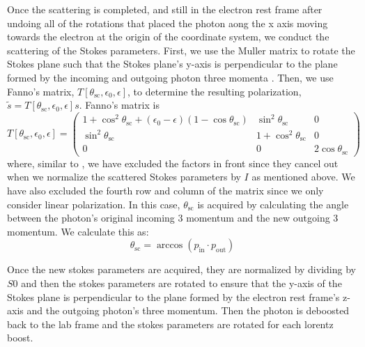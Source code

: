 \documentclass[12pt,a4paper]{article}
\begin{document}
Once the scattering is completed, and still in the electron rest frame after undoing all of the rotations that placed the photon aong the x axis moving towards the electron at the origin of the coordinate system, we conduct the scattering of the Stokes parameters. First, we use the Muller matrix to rotate the Stokes plane such that the Stokes plane's y-axis is perpendicular to the plane formed by the incoming and outgoing photon three momenta \citep{McMaster:1961aa, lundman2014polarization}. Then, we use Fanno's matrix, $T[\theta_{\mathrm{sc}},\epsilon_{0}, \epsilon]$, \citep{McMaster:1961aa} to determine the resulting polarization, $\tilde{s}=T[\theta_{\mathrm{sc}},\epsilon_{0}, \epsilon]s$. Fanno's matrix is 
\begin{equation}
T[\theta_{\mathrm{sc}},\epsilon_{0}, \epsilon]=  \left(\begin{array}{lll}{1+\cos ^{2} \theta_{\mathrm{sc}}+\left(\epsilon_{0}-\epsilon \right)\left(1-\cos \theta_{\mathrm{sc}}\right)} & {\sin ^{2} \theta_{\mathrm{sc}}} & {0} \\ {\sin ^{2} \theta_{\mathrm{sc}}} & {1+\cos ^{2} \theta_{\mathrm{sc}}} & {0} \\ {0} & {0} & {2 \cos \theta_{\mathrm{sc}}}\end{array}\right)
\end{equation}
where, similar to \cite{krawczynski2011polarization},  we have excluded the factors in front since they cancel out when we normalize the scattered Stokes parameters by $I$ as mentioned above. We have also excluded the fourth row and column of the matrix since we only consider linear polarization. In this case, $\theta_{\mathrm{sc}}$ is acquired by calculating the angle between the photon's original incoming 3 momentum and the new outgoing 3 momentum. We calculate this as:
\begin{equation}
\theta_{\mathrm{sc}}=\arccos(p_\mathrm{in} \cdot p_\mathrm{out})
\end{equation}

Once the new stokes parameters are acquired, they are normalized by dividing by $S0$ and then the stokes parameters are rotated to ensure that the y-axis of the Stokes plane is perpendicular to the plane formed by the electron rest frame's z-axis and the outgoing photon's three momentum. Then the photon is deboosted back to the lab frame and the stokes parameters are rotated for each lorentz boost.
\end{document}
